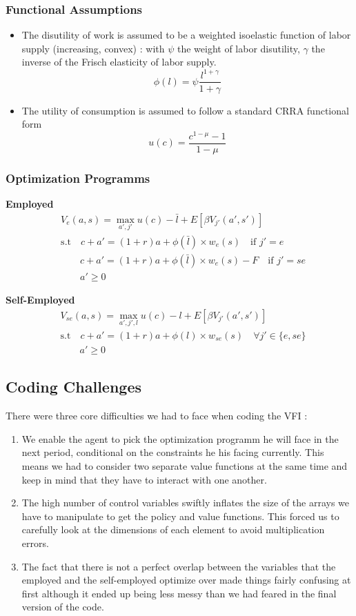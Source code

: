 \documentclass{article}
\begin{document}
\subsubsection*{Functional Assumptions}
\begin{itemize}
    \item The disutility of work is assumed to be a weighted isoelastic function of labor supply (increasing, convex) : with $\psi$ the weight of labor disutility, $\gamma$ the inverse of the Frisch elasticity of labor supply.
    $$\phi(l)=\psi \frac{l^{1+\gamma}}{1+\gamma}$$
    \item The utility of consumption is assumed to follow a standard CRRA functional form 
    $$u(c) = \frac{c^{1-\mu}-1}{1-\mu}$$
\end{itemize}

\subsubsection*{Optimization Programms}
\textbf{Employed}
$$\begin{aligned} &V_e(a,s)=\max_{a',j'}u(c)-\bar{l}+E[\beta V_{j'}(a',s')]\\
&\text{s.t}\quad 
    c+a'=(1+r)a+\phi(\bar{l})\times w_{e}(s) \quad \text{if }j'=e \\
    &\qquad c+a'=(1+r)a+\phi(\bar{l})\times w_{e}(s)-F \quad \text{if }j'=se\\
&\qquad a' \geq 0
\end{aligned}$$

\noindent \textbf{Self-Employed}
$$\begin{aligned} &V_{se}(a,s)=\max_{a',j',l}u(c)-l+E[\beta V_{j'}(a',s')]\\
&\text{s.t}\quad c+a'=(1+r)a+\phi(l)\times w_{se}(s) \quad \forall j'\in \{e,se\} \\
&\qquad a' \geq 0
\end{aligned}$$

\subsection{Coding Challenges}
There were three core difficulties we had to face when coding the VFI : 
\begin{enumerate}
    \item We enable the agent to pick the optimization programm he will face in the next period, conditional on the constraints he his facing currently. This means we had to consider two separate value functions at the same time and keep in mind that they have to interact with one another. 
    \item The high number of control variables swiftly inflates the size of the arrays we have to manipulate to get the policy and value functions. This forced us to carefully look at the dimensions of each element to avoid multiplication errors. 
    \item The fact that there is not a perfect overlap between the variables that the employed and the self-employed optimize over made things fairly confusing at first although it ended up being less messy than we had feared in the final version of the code. 
\end{enumerate}
\end{document}
